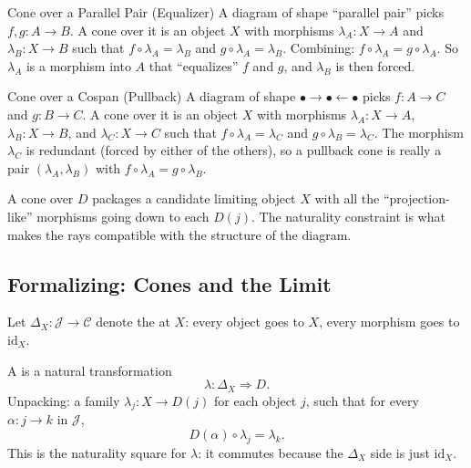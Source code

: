 \begin{example}{Cone over a Parallel Pair (Equalizer)}
A diagram of shape ``parallel pair'' picks $f, g : A \to B$. A cone over
it is an object $X$ with morphisms $\lambda_A : X \to A$ and $\lambda_B :
X \to B$ such that $f \circ \lambda_A = \lambda_B$ and $g \circ \lambda_A
= \lambda_B$. Combining: $f \circ \lambda_A = g \circ \lambda_A$. So
$\lambda_A$ is a morphism into $A$ that ``equalizes'' $f$ and $g$, and
$\lambda_B$ is then forced.
\end{example}

\begin{example}{Cone over a Cospan (Pullback)}
A diagram of shape $\bullet \to \bullet \leftarrow \bullet$ picks
$f : A \to C$ and $g : B \to C$. A cone over it is an object $X$ with
morphisms $\lambda_A : X \to A$, $\lambda_B : X \to B$, and
$\lambda_C : X \to C$ such that $f \circ \lambda_A = \lambda_C$ and
$g \circ \lambda_B = \lambda_C$. The morphism $\lambda_C$ is redundant
(forced by either of the others), so a pullback cone is really a pair
$(\lambda_A, \lambda_B)$ with $f \circ \lambda_A = g \circ \lambda_B$.
\end{example}

\begin{dialog}
A cone over $D$ packages a candidate limiting object $X$ with all the
``projection-like'' morphisms going down to each $D(j)$. The naturality
constraint is what makes the rays compatible with the structure of the
diagram.
\end{dialog}

\subsection{Formalizing: Cones and the Limit}

Let $\Delta_X : \mathcal{J} \to \mathcal{C}$ denote the  at $X$: every object goes to $X$, every morphism goes to
$\mathrm{id}_X$.

A  is a natural transformation
\begin{equation*}
  \lambda : \Delta_X \Rightarrow D.
\end{equation*}
Unpacking: a family $\lambda_j : X \to D(j)$ for each object $j$, such
that for every $\alpha : j \to k$ in $\mathcal{J}$,
\begin{equation*}
  D(\alpha) \circ \lambda_j = \lambda_k.
\end{equation*}
This is the naturality square for $\lambda$: it commutes because the
$\Delta_X$ side is just $\mathrm{id}_X$.

